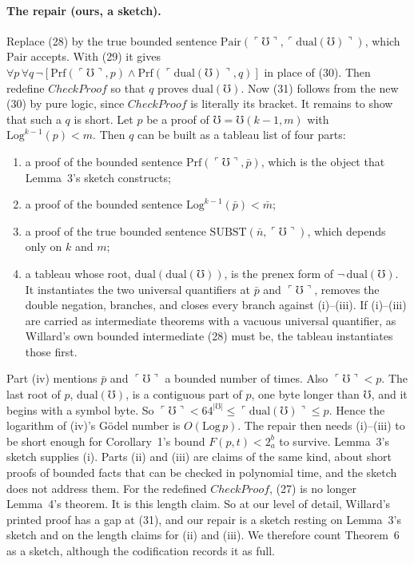 \documentclass[11pt]{article}
\newcommand{\Prf}{\mathrm{Prf}}
\newcommand{\Subst}{\mathrm{SUBST}}
\newcommand{\Pair}{\mathrm{Pair}}
\newcommand{\gn}[1]{\ulcorner #1\urcorner}  %
\newcommand{\Mho}{\mho}                     %
\theoremstyle{plain}
\theoremstyle{definition}
\begin{document}
\paragraph{The repair (ours, a sketch).} Replace (28) by the true bounded
sentence $\Pair(\gn{\Mho}, \gn{\mathrm{dual}(\Mho)})$, which $\Pair$ accepts.
With (29) it gives $\forall p\,\forall q\,\neg[\Prf(\gn{\Mho}, p) \wedge
\Prf(\gn{\mathrm{dual}(\Mho)}, q)]$ in place of (30). Then redefine
$\mathit{CheckProof}$ so that $q$ proves $\mathrm{dual}(\Mho)$. Now (31)
follows from the new (30) by pure logic, since $\mathit{CheckProof}$ is
literally its bracket. It remains to show that such a $q$ is short. Let $p$ be
a proof of $\Mho = \Mho(k-1,m)$ with $\mathrm{Log}^{k-1}(p) < m$. Then $q$ can
be built as a tableau list of four parts:
\begin{enumerate}[label=(\roman*), leftmargin=2.5em]
\item a proof of the bounded sentence $\Prf(\gn{\Mho}, \bar p)$, which is the
  object that Lemma~3's sketch constructs;
\item a proof of the bounded sentence $\mathrm{Log}^{k-1}(\bar p) < \bar m$;
\item a proof of the true bounded sentence $\Subst(\bar n, \gn{\Mho})$, which
  depends only on $k$ and $m$;
\item a tableau whose root, $\mathrm{dual}(\mathrm{dual}(\Mho))$, is the
  prenex form of $\neg\,\mathrm{dual}(\Mho)$. It instantiates the two
  universal quantifiers at $\bar p$ and $\gn{\Mho}$, removes the double
  negation, branches, and closes every branch against (i)--(iii). If
  (i)--(iii) are carried as intermediate theorems with a vacuous universal
  quantifier, as Willard's own bounded intermediate (28) must be, the tableau
  instantiates those first.
\end{enumerate}
Part (iv) mentions $\bar p$ and $\gn{\Mho}$ a bounded number of times. Also
$\gn{\Mho} < p$. The last root of $p$, $\mathrm{dual}(\Mho)$, is a contiguous
part of $p$, one byte longer than $\Mho$, and it begins with a symbol byte. So
$\gn{\Mho} < 64^{|\Mho|} \le \gn{\mathrm{dual}(\Mho)} \le p$. Hence the
logarithm of (iv)'s Gödel number is $O(\mathrm{Log}\,p)$. The repair then
needs (i)--(iii) to be short enough for Corollary~1's bound
$F(p,t) < 2^b_a$ to survive. Lemma~3's sketch supplies (i). Parts (ii) and
(iii) are claims of the same kind, about short proofs of bounded facts that
can be checked in polynomial time, and the sketch does not address them. For
the redefined $\mathit{CheckProof}$, (27) is no longer Lemma~4's theorem. It
is this length claim. So at our level of detail, Willard's printed proof has
a gap at (31), and our repair is a sketch resting on Lemma~3's sketch and on
the length claims for (ii) and (iii). We therefore count Theorem~6 as a
sketch, although the codification records it as full.
\end{document}
